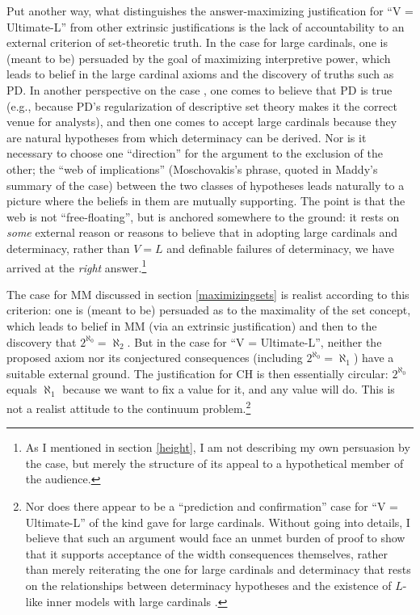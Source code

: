 \documentclass[letterpaper,12pt]{article}
\begin{document}
Put another way, what distinguishes the answer-maximizing justification for ``V = Ultimate-L'' from other extrinsic justifications is the lack of accountability to an external criterion of set-theoretic truth. In the case for large cardinals, one is (meant to be) persuaded by the goal of maximizing interpretive power, which leads to belief in the large cardinal axioms and the discovery of truths such as PD. In another perspective on the case \citep{sep-large-cardinals-determinacy}, one comes to believe that PD is true (e.g., because PD's regularization of descriptive set theory makes it the correct venue for analysts), and then one comes to accept large cardinals because they are natural hypotheses from which determinacy can be derived. Nor is it necessary to choose one ``direction'' for the argument to the exclusion of the other; the ``web of implications'' (Moschovakis's phrase, quoted in Maddy's \citeyearpar{Maddy2011-MADDTA} summary of the case) between the two classes of hypotheses leads naturally to a picture where the beliefs in them are mutually supporting. The point is that the web is not ``free-floating'', but is anchored somewhere to the ground: it rests on \emph{some} external reason or reasons to believe that in adopting large cardinals and determinacy, rather than $V = L$ and definable failures of determinacy, we have arrived at the \emph{right} answer.\footnote{As I mentioned in section \ref{height}, I am not describing my own persuasion by the case, but merely the structure of its appeal to a hypothetical member of the audience.}

The case for MM discussed in section \ref{maximizingsets} is realist according to this criterion: one is (meant to be) persuaded as to the maximality of the set concept, which leads to belief in MM (via an extrinsic justification) and then to the discovery that $2^{\aleph_0} = \aleph_2$. But in the case for ``V = Ultimate-L'', neither the proposed axiom nor its conjectured consequences (including $2^{\aleph_0} = \aleph_1$) have a suitable external ground. The justification for CH is then essentially circular: $2^{\aleph_0}$ equals $\aleph_1$ because we want to fix a value for it, and any value will do. This is not a realist attitude to the continuum problem.\footnote{Nor does there appear to be a ``prediction and confirmation'' case for ``V = Ultimate-L'' of the kind \cite{martin1998mathematical} gave for large cardinals. Without going into details, I believe that such an argument would face an unmet burden of proof to show that it supports acceptance of the width consequences themselves, rather than merely reiterating the one for large cardinals and determinacy that rests on the relationships between determinacy hypotheses and the existence of $L$-like inner models with large cardinals \citep{sep-large-cardinals-determinacy}.}
\end{document}
